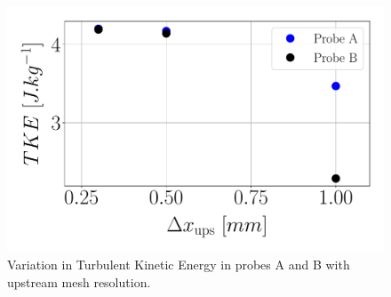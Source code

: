 \begin{figure}[ht]
	\centering
	\includegraphics[scale=0.28]{./part2_developments/figures_ch5_resolved_JICF/results_ics_mesh_convergence_probes/TKE_vs_dx_in_probes.pdf}
   \vspace*{-0.15in}
   \caption{Variation in Turbulent Kinetic Energy in probes A and B with upstream mesh resolution.}
   \label{fig:TKE_vs_dx_in_probes}
\end{figure}


